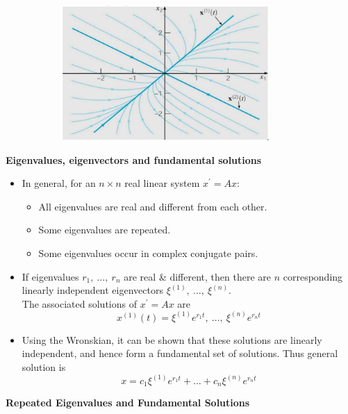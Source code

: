 \documentclass[11pt,a4paper]{article}
\begin{document}
\begin{itemize}
\begin{center}
\begin{figure}[H]
				\begin{subfigure}{.45\textwidth}
					\centering
					\includegraphics[width=0.87\textwidth]{figure/Lec12f5.PNG}
				\end{subfigure}
			\end{figure}
		\end{center}
	\end{itemize}
	\textbf{Eigenvalues, eigenvectors and fundamental solutions}
	\begin{itemize}
		\item In general, for an $n \times n$ real linear system $x^\prime = Ax$:
		\begin{itemize}
			\item[\labelitemi] All eigenvalues are real and different from each other.
			\item[\labelitemi] Some eigenvalues are repeated.
			\item[\labelitemi] Some eigenvalues occur in complex conjugate pairs.
		\end{itemize}
		\item If eigenvalues $r_1,\ \ldots,\ r_n$ are real \& different, then there are $n$ corresponding linearly independent eigenvectors $\xi^{(1)},\ \ldots,\ \xi^{(n)}$.\\
		The associated solutions of $x^\prime = Ax$ are
		$$
		x^{(1)}(t) = \xi^{(1)}e^{r_1t},\ \ldots,\ \xi^{(n)}e^{r_nt}
		$$
		\item Using the Wronskian, it can be shown that these solutions are linearly independent, and hence form a fundamental set of solutions. Thus general solution is 
		$$
		x = c_1\xi^{(1)}e^{r_1t} + \ldots + c_n\xi^{(n)}e^{r_nt}
		$$
	\end{itemize}
	\textbf{Repeated Eigenvalues and Fundamental Solutions}
\end{document}
